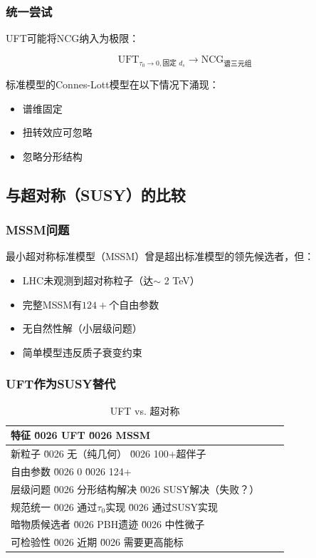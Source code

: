 \subsubsection{统一尝试}

UFT可能将NCG纳入为极限：

\begin{equation}
    \text{UFT}_{\tau_0 \to 0, \text{固定 } d_s} \rightarrow \text{NCG}_{\text{谱三元组}}
\end{equation}

标准模型的Connes-Lott模型在以下情况下涌现：
\begin{itemize}
    \item 谱维固定
    \item 扭转效应可忽略
    \item 忽略分形结构
\end{itemize}

\subsection{与超对称（SUSY）的比较}

\subsubsection{MSSM问题}

最小超对称标准模型（MSSM）曾是超出标准模型的领先候选者，但：
\begin{itemize}
    \item LHC未观测到超对称粒子（达$\sim$ 2 TeV）
    \item 完整MSSM有$124+$个自由参数
    \item 无自然性解（小层级问题）
    \item 简单模型违反质子衰变约束
\end{itemize}

\subsubsection{UFT作为SUSY替代}

\begin{table}[htbp]
\centering
\caption{UFT vs. 超对称}
\begin{tabular}{@{}lcc@{}}
\toprule
\textbf{特征} \u0026 \textbf{UFT} \u0026 \textbf{MSSM} \\
\midrule
新粒子 \u0026 无（纯几何） \u0026 100+超伴子 \\
自由参数 \u0026 0 \u0026 124+ \\
层级问题 \u0026 分形结构解决 \u0026 SUSY解决（失败？） \\
规范统一 \u0026 通过$\tau_0$实现 \u0026 通过SUSY实现 \\
暗物质候选者 \u0026 PBH遗迹 \u0026 中性微子 \\
可检验性 \u0026 近期 \u0026 需要更高能标 \\
\bottomrule
\end{tabular}
\end{table}

